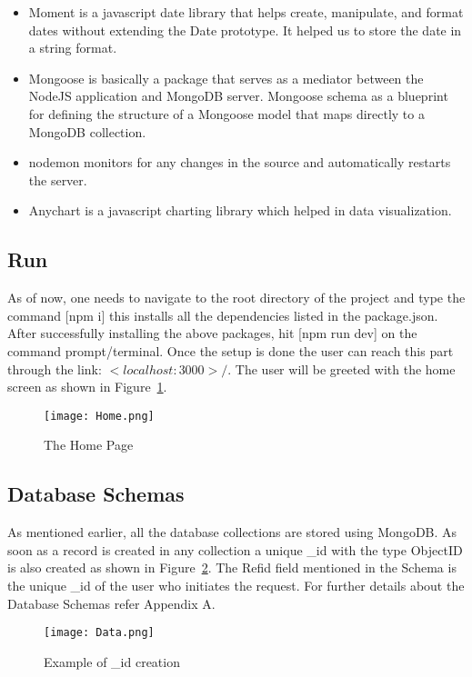 \documentclass[conference]{IEEEtran}
\begin{document}
\begin{itemize}
    \item Moment is a javascript date library that helps create, manipulate, and format dates without extending the Date prototype. It helped us to store the date in a string format.
    \item Mongoose is basically a package that serves as a mediator between the NodeJS application and MongoDB server. Mongoose schema as a blueprint for defining the structure of a Mongoose model that maps directly to a MongoDB collection.
    \item nodemon monitors for any changes in the source and automatically restarts the server.
    \item Anychart is a javascript charting library which helped in data visualization. 
\end{itemize}
\subsection{Run}
As of now, one needs to navigate to the root directory of the project and type the command [npm i] this installs all the dependencies listed in the package.json. After successfully installing the above packages, hit  [npm run dev]  on the command prompt/terminal. Once the setup is done the user can reach this part through the link: \( <localhost:3000 >/ \). The user will be greeted with the home screen as shown in Figure~\ref{fig:3}.
\begin{figure}[htbp]
\centerline{\texttt{[image: Home.png]}}
\caption{The Home Page}
\label{fig:3}
\end{figure}
\subsection{Database Schemas}
As mentioned earlier, all the database collections are stored using MongoDB. As soon as a record is created in any collection a unique \_id with the type ObjectID is also created as shown in Figure~\ref{fig:4}. The Refid field mentioned in the Schema is the unique \_id of the user who initiates the request. For further details about the Database Schemas refer Appendix A.
\begin{figure}[htbp]
\centerline{\texttt{[image: Data.png]}}
\caption{Example of \_id creation}
\label{fig:4}
\end{figure}
\end{document}
